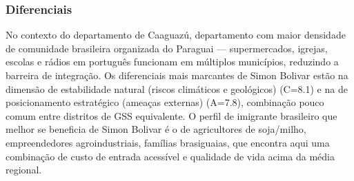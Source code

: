 \subsubsection*{Diferenciais}\label{dif-simon-bolivar-0519}
No contexto do departamento de Caaguazú, departamento com maior densidade de comunidade brasileira organizada do Paraguai — supermercados, igrejas, escolas e rádios em português funcionam em múltiplos municípios, reduzindo a barreira de integração. Os diferenciais mais marcantes de Simon Bolivar estão na dimensão de estabilidade natural (riscos climáticos e geológicos) (C=8.1) e na de posicionamento estratégico (ameaças externas) (A=7.8), combinação pouco comum entre distritos de GSS equivalente. O perfil de imigrante brasileiro que melhor se beneficia de Simon Bolivar é o de agricultores de soja/milho, empreendedores agroindustriais, famílias brasiguaias, que encontra aqui uma combinação de custo de entrada acessível e qualidade de vida acima da média regional.

